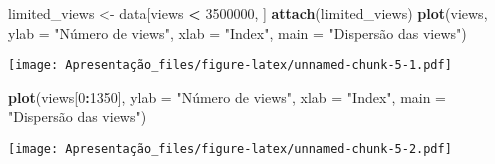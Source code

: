 \documentclass[]{article}
\newenvironment{Shaded}{\begin{snugshade}}{\end{snugshade}}
\newcommand{\DataTypeTok}[1]{\textcolor[rgb]{0.13,0.29,0.53}{#1}}
\newcommand{\DecValTok}[1]{\textcolor[rgb]{0.00,0.00,0.81}{#1}}
\newcommand{\KeywordTok}[1]{\textcolor[rgb]{0.13,0.29,0.53}{\textbf{#1}}}
\newcommand{\NormalTok}[1]{#1}
\newcommand{\OperatorTok}[1]{\textcolor[rgb]{0.81,0.36,0.00}{\textbf{#1}}}
\newcommand{\StringTok}[1]{\textcolor[rgb]{0.31,0.60,0.02}{#1}}
\begin{document}
\begin{Shaded}
\begin{Highlighting}[]
\NormalTok{  limited_views <-}\StringTok{ }\NormalTok{data[views }\OperatorTok{<}\StringTok{ }\DecValTok{3500000}\NormalTok{, ]}
  \KeywordTok{attach}\NormalTok{(limited_views)}
  \KeywordTok{plot}\NormalTok{(views,  }\DataTypeTok{ylab =} \StringTok{"Número de views"}\NormalTok{,  }\DataTypeTok{xlab =} \StringTok{"Index"}\NormalTok{, }\DataTypeTok{main =} \StringTok{"Dispersão das views"}\NormalTok{)}
\end{Highlighting}
\end{Shaded}

\texttt{[image: Apresentação\_files/figure-latex/unnamed-chunk-5-1.pdf]}

\begin{Shaded}
\begin{Highlighting}[]
  \KeywordTok{plot}\NormalTok{(views[}\DecValTok{0}\OperatorTok{:}\DecValTok{1350}\NormalTok{], }\DataTypeTok{ylab =} \StringTok{"Número de views"}\NormalTok{, }\DataTypeTok{xlab =} \StringTok{"Index"}\NormalTok{, }\DataTypeTok{main =} \StringTok{"Dispersão das views"}\NormalTok{)}
\end{Highlighting}
\end{Shaded}

\texttt{[image: Apresentação\_files/figure-latex/unnamed-chunk-5-2.pdf]}
\end{document}
